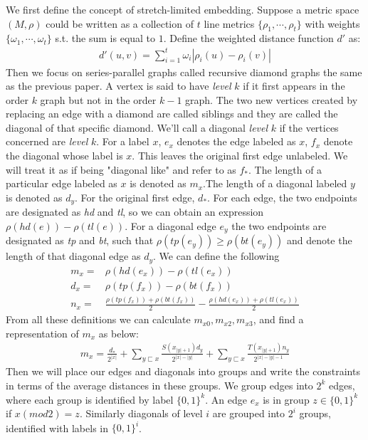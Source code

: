 \documentclass[twoside,11pt]{homework}
\begin{document}
\begin{enumerate}
    We first define the concept of stretch-limited embedding. Suppose a metric space $(M,\rho)$ could be written as a collection of $t$ line metrics $\{\rho_{1}, \cdots, \rho_{t}\}$ with weights $\{\omega_{1}, \cdots, \omega_{t}\}$ s.t. the sum is equal to $1$. Define the weighted distance function $d'$ as:
    \begin{align*}
        d'(u,v) = \sum\limits_{i=1}^{t}\omega_{i}|\rho_{i}(u)-\rho_{i}(v)|
    \end{align*}
    Then we focus on series-parallel graphs called recursive diamond graphs the same as the previous paper. A vertex is said to have \textit{level} $k$ if it first appears in the order $k$ graph but not in the order $k-1$ graph. The two new vertices created by replacing an edge with a diamond are called siblings and they are called the diagonal of that specific diamond. We'll call a diagonal \textit{level} $k$ if the vertices concerned are \textit{level} $k$. For a label $x$, $e_{x}$ denotes the edge labeled as $x$, $f_{x}$ denote the diagonal whose label is $x$. This leaves the original first edge unlabeled. We will treat it as if being "diagonal like" and refer to as $f_{*}$. The length of a particular edge labeled as $x$ is denoted as $m_{x}$.The length of a diagonal labeled $y$ is denoted as $d_{y}$. For the original first edge, $d_{*}$. For each edge, the two endpoints are designated as \textit{hd} and \textit{tl}, so we can obtain an expression $\rho(hd(e))-\rho(tl(e))$. For a diagonal edge $e_{y}$ the two endpoints are designated as \textit{tp} and \textit{bt}, such that $\rho(tp(e_{y})) \geq \rho(bt(e_{y}))$ and denote the length of that diagonal edge as $d_{y}$. We can define the following
    \begin{align*}
    m_{x} =& \rho(hd(e_{x})) - \rho(tl(e_{x}))\\
    d_{x} =& \rho(tp(f_{x})) - \rho(bt(f_{x}))\\
    n_{x} =& \frac{\rho(tp(f_{x}))+\rho(bt(f_{x}))}{2} - \frac{\rho(hd(e_{x})) + \rho(tl(e_{x}))}{2}
    \end{align*}
    From all these definitions we can calculate $m_{x0},m_{x2},m_{x3}$, and find a representation of $m_x$ as below:
    \begin{align*}
    m_{x} = \frac{d_{*}}{2^{|x|}} + \sum\limits_{y \sqsubset x}\frac{S(x_{|y|+1})d_{y}}{2^{|x|-|y|}} + \sum\limits_{y \sqsubset x} \frac{T(x_{|y|+1})n_{y}}{2^{|x|-|y|-1}}
    \end{align*}
    Then we will place our edges and diagonals into groups and write the constraints in terms of the average distances in these groups. We group edges into $2^{k}$ edges, where each group is identified by label $\{0,1\}^{k}$. An edge $e_{x}$ is in group $z \in \{0,1\}^{k}$ if $x (mod 2) = z$. Similarly diagonals of level $i$ are grouped into $2^i$ groups, identified with labels in $\{0,1\}^i$.

\end{enumerate}
\end{document}
